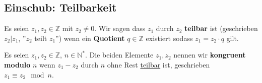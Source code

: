 \documentclass[../../main.tex]{subfiles}
\begin{document}
	\subsection{Einschub: Teilbarkeit}

	\begin{definition}
		\label{def:teilbar}
		\label{def:Quotient}
		Es seien $z_1, z_2 \in \mathbb{Z}$ mit $z_2 \not = 0$. Wir sagen dass $z_1$ durch $z_2$ \textbf{teilbar} ist (geschrieben $z_2|z_1$, ''$z_2$ teilt $z_1$'') wenn ein \textbf{Quotient} $q \in \mathbb{Z}$ existiert sodass $z_1 = z_2 \cdot q$ gilt.
	\end{definition}

	
	\begin{definition}
		\label{def:kongruentModuloN}
		Es seien $z_1,z_2 \in \mathbb{Z}$, $n \in \mathbb{N}^*$. Die beiden Elemente $z_1, z_2$ nennen wir \textbf{kongruent modulo} $n$ wenn $z_1 - z_2$ durch $n$ ohne Rest \hyperref[def:teilbar]{teilbar} ist, geschrieben $z_1 \equiv z_2 \mod n$. 
	\end{definition}
\end{document}
